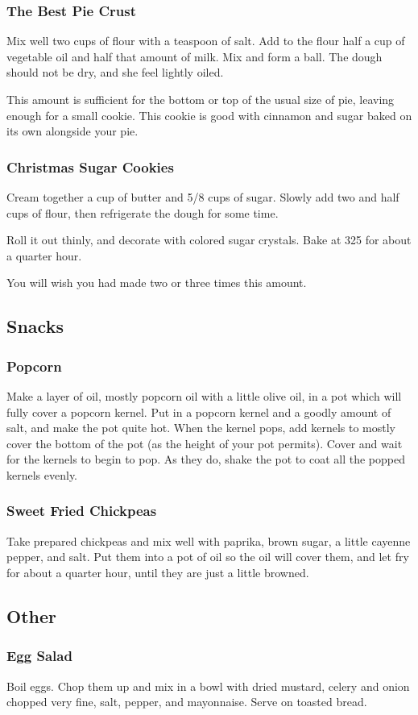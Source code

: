 \documentclass[10pt]{article}
\begin{document}
\subsubsection*{The Best Pie Crust}

Mix well two cups of flour with a teaspoon of salt.
Add to the flour half a cup of vegetable oil and half that amount of milk.
Mix and form a ball.
The dough should not be dry, and she feel lightly oiled.

This amount is sufficient for the bottom or top of the usual size of pie, leaving enough for a small cookie.
This cookie is good with cinnamon and sugar baked on its own alongside your pie.

\subsubsection*{Christmas Sugar Cookies}

Cream together a cup of butter and 5/8 cups of sugar.
Slowly add two and half cups of flour, then refrigerate the dough for some time.

Roll it out thinly, and decorate with colored sugar crystals.
Bake at 325 for about a quarter hour.

You will wish you had made two or three times this amount.

\subsection*{Snacks}

\subsubsection*{Popcorn}

Make a layer of oil, mostly popcorn oil with a little olive oil, in a pot which will fully cover a popcorn kernel.
Put in a popcorn kernel and a goodly amount of salt, and make the pot quite hot.
When the kernel pops, add kernels to mostly cover the bottom of the pot (as the height of your pot permits).
Cover and wait for the kernels to begin to pop.
As they do, shake the pot to coat all the popped kernels evenly.

\subsubsection*{Sweet Fried Chickpeas}

Take prepared chickpeas and mix well with paprika, brown sugar, a little cayenne pepper, and salt.
Put them into a pot of oil so the oil will cover them, and let fry for about a quarter hour, until they are just a little browned.

\subsection*{Other}

\subsubsection*{Egg Salad}

Boil eggs.
Chop them up and mix in a bowl with dried mustard, celery and onion chopped very fine, salt, pepper, and mayonnaise.
Serve on toasted bread.
\end{document}
